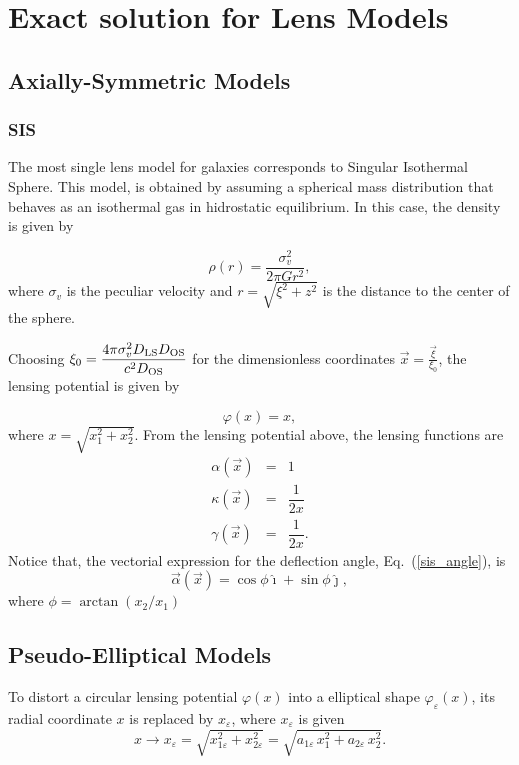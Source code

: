 \chapter{Exact solution for Lens Models}

\section{Axially-Symmetric Models}

\subsection{SIS}
The most single lens model for galaxies  corresponds to Singular Isothermal
Sphere. This model, is obtained by assuming a spherical mass distribution
that behaves as an isothermal gas in hidrostatic equilibrium. In this case,
the density is given by

\begin{equation}
 \rho(r)=\dfrac{\sigma_v^2}{2\pi G r^2},
\end{equation}
where $\sigma_v$ is the peculiar velocity  and $r=\sqrt{\xi^2+z^2}$ is the
distance to the center of the sphere. 

Choosing $\xi_0= \dfrac{4\pi \sigma^2_v D_{\rm LS} D_{\rm OS}}{c^2 D_{\rm
OS}}$ for the dimensionless coordinates $\vec{x}=\frac{\vec{\xi}}{\xi_0}$, the
lensing potential is given by

\begin{equation}
 \varphi(x)=x,
\label{sis_pot}
\end{equation}
where $x=\sqrt{x^2_1+x^2_2}$. From the lensing potential above, the lensing
functions are
\begin{eqnarray}
 \alpha(\vec{x}) &=& 1 \label{sis_angle}\\
\kappa(\vec{x}) &= & \dfrac{1}{2x} \label{sis_convg}\\
\gamma(\vec{x}) & = &  \dfrac{1}{2x} \label{sis_shear}.
\end{eqnarray}
Notice that, the vectorial expression for the deflection angle,
Eq.~(\ref{sis_angle}), is
\begin{equation}
 \vec{\alpha}(\vec{x})=\cos{\phi}\hat{\imath} + \sin{\phi}\hat{\jmath},
\end{equation}
where $\phi=\arctan{(x_2/x_1)}$


\section{Pseudo-Elliptical Models}
To distort a circular lensing potential $\varphi(x)$ into a elliptical shape $\varphi_\varepsilon(x)$, its radial
coordinate $x$ is replaced by $x_\varepsilon$, where $x_\varepsilon$ is given 
\begin{equation}
 x \rightarrow x_\varepsilon = \sqrt{x^2_{1\varepsilon}+x^2_{2\varepsilon}}=
\sqrt{a_{1\varepsilon}\,x^2_1+a_{2\varepsilon}\,x^2_2}.%
\label{subti-ellip}
\end{equation}

